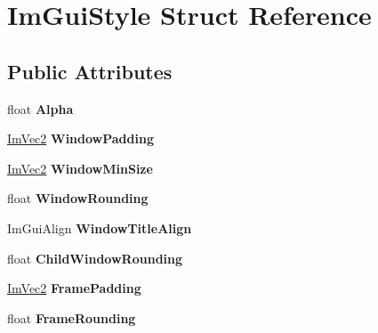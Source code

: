\hypertarget{struct_im_gui_style}{}\section{Im\+Gui\+Style Struct Reference}
\label{struct_im_gui_style}
\subsection*{Public Attributes}
\begin{DoxyCompactItemize}
\item 
\mbox{\label{struct_im_gui_style_a993312606e9dcb7ca165245150a4da72}} 
float {\bfseries Alpha}
\item 
\mbox{\label{struct_im_gui_style_a37f156b53e6dcc99ff57366ceafe8b50}} 
\mbox{\hyperlink{struct_im_vec2}{Im\+Vec2}} {\bfseries Window\+Padding}
\item 
\mbox{\label{struct_im_gui_style_a060b2f743a086d0f0fee4cd5b3f372d4}} 
\mbox{\hyperlink{struct_im_vec2}{Im\+Vec2}} {\bfseries Window\+Min\+Size}
\item 
\mbox{\label{struct_im_gui_style_acd902c2ab4b53d4bb0f64da608320894}} 
float {\bfseries Window\+Rounding}
\item 
\mbox{\label{struct_im_gui_style_ac1f56928f15c38218b149ed74790c834}} 
Im\+Gui\+Align {\bfseries Window\+Title\+Align}
\item 
\mbox{\label{struct_im_gui_style_a4c7010149e61a5d2d954710f9f22b767}} 
float {\bfseries Child\+Window\+Rounding}
\item 
\mbox{\label{struct_im_gui_style_af58dc4e954ac95fdb3b0df8efb2fa564}} 
\mbox{\hyperlink{struct_im_vec2}{Im\+Vec2}} {\bfseries Frame\+Padding}
\item 
\mbox{\label{struct_im_gui_style_a15402cededdef985487e986ccce73ad2}} 
float {\bfseries Frame\+Rounding}
\item 
\mbox{\label{struct_im_gui_style_a6bc07d81e049cd75e86e6b3753c0da4a}} 

\end{DoxyCompactItemize}
